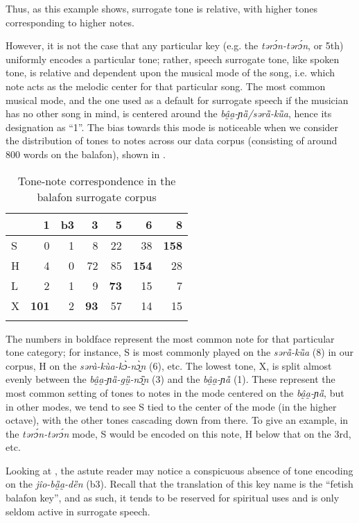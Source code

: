 \documentclass[output=paper]{langscibook}
\begin{document}
Thus, as this example shows, surrogate tone is relative, with higher tones corresponding to higher notes. 

However, it is not the case that any particular key (e.g. the \textit{tərɔ́n-tərɔ́n}, or 5th) uniformly encodes a particular tone; rather, speech surrogate tone, like spoken tone, is relative and dependent upon the {\sc musical mode} of the song, i.e. which note acts as the melodic center for that particular song. The most common musical mode, and the one used as a default for surrogate speech if the musician has no other song in mind, is centered around the \textit{bâ̰a̰-ɲȁ/sərȁ-kȕa}, hence its designation as ``1''. The bias towards this mode is noticeable when we consider the distribution of tones to notes across our data corpus (consisting of around 800 words on the balafon), shown in . 

\begin{table}
 \caption{Tone-note correspondence in the balafon surrogate corpus\label{tab:mcpherson:tonenote}} 
\begin{tabular}{lrrrrrr} 
\lsptoprule
   & {1} & {b3} & {3} & {5} & {6} & {8} \\ \midrule
   S & 0 & 1 & 8 & 22 & 38 & \textbf{158} \\ 
   H & 4 & 0 & 72& 85 & \textbf{154} & 28 \\ 
   L & 2 & 1 & 9 & \textbf{73} & 15 & 7 \\ 
   X & \textbf{101} & 2 & \textbf{93} & 57 & 14 & 15 \\
\lspbottomrule
\end{tabular} 
\end{table}

The numbers in boldface represent the most common note for that particular tone category; for instance, S is most commonly played on the \textit{sərȁ-kȕa} (8) in our corpus, H on the \textit{sərà-kùa-kɔ̀-nɔ̰̀n} (6), etc. The lowest tone, X, is split almost evenly between the \textit{bâ̰a̰-ɲȁ-gṵ̏-nɔ̰̏n} (3) and the \textit{bâ̰a̰-ɲȁ} (1). These represent the most common setting of tones to notes in the mode centered on the \textit{bâ̰a̰-ɲȁ}, but in other modes, we tend to see S tied to the center of the mode (in the higher octave), with the other tones cascading down from there. To give an example, in the \textit{tərɔ́n-tərɔ́n} mode, S would be encoded on this note, H below that on the 3rd, etc. 

Looking at , the astute reader may notice a conspicuous absence of tone encoding on the \textit{jîo-bȁ̰a̰-dȅn} (b3). Recall that the translation of this key name is the ``fetish balafon key'', and as such, it tends to be reserved for spiritual uses and is only seldom active in surrogate speech. 
\end{document}
